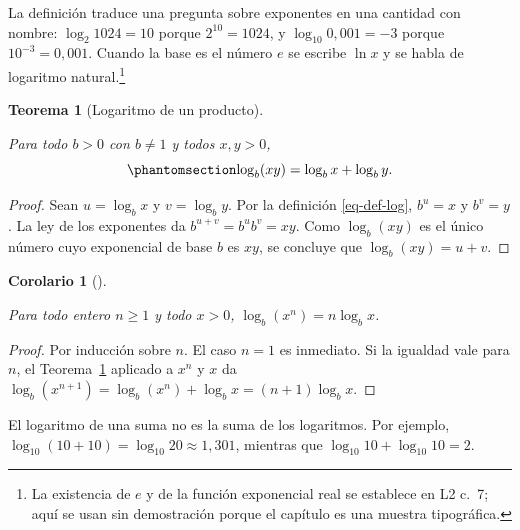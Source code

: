 \documentclass[
  spanish,
  letterpaper,
  a4paper,
  11pt,
  oneside,
  numbers=noenddot]{scrbook}
\theoremstyle{definition}
\theoremstyle{plain}
\newtheorem{corollary}{Corolario}[chapter]
\theoremstyle{definition}
\theoremstyle{definition}
\theoremstyle{plain}
\newtheorem{theorem}{Teorema}[chapter]
\theoremstyle{remark}
\begin{document}
La definición traduce una pregunta sobre exponentes en una cantidad con
nombre: \(\log_{2} 1024 = 10\) porque \(2^{10} = 1024\), y
\(\log_{10} 0{,}001 = -3\) porque \(10^{-3} = 0{,}001\). Cuando la base
es el número \(e\) se escribe \(\ln x\) y se habla de logaritmo
natural.\footnote{La
  existencia de \(e\) y de la función exponencial real se establece en
  L2 c.~7; aquí se usan sin demostración porque el capítulo es una
  muestra tipográfica.}

\begin{theorem}[Logaritmo de un
producto]\protect\hypertarget{thm-log-producto}{}\label{thm-log-producto}

Para todo \(b > 0\) con \(b \neq 1\) y todos \(x, y > 0\),
\begin{equation}\protect\phantomsection\label{eq-log-producto}{
\log_b (xy) = \log_b x + \log_b y .
}\end{equation}

\end{theorem}

\begin{proof}
Sean \(u = \log_b x\) y \(v = \log_b y\). Por la definición
\ref{eq-def-log}, \(b^{u} = x\) y \(b^{v} = y\). La ley de los
exponentes da \(b^{u+v} = b^{u} b^{v} = xy\). Como \(\log_b(xy)\) es el
único número cuyo exponencial de base \(b\) es \(xy\), se concluye que
\(\log_b(xy) = u + v\).
\end{proof}

\begin{corollary}[]\protect\hypertarget{cor-log-potencia}{}\label{cor-log-potencia}

Para todo entero \(n \geq 1\) y todo \(x > 0\),
\(\log_b (x^{n}) = n \log_b x\).

\end{corollary}

\begin{proof}
Por inducción sobre \(n\). El caso \(n = 1\) es inmediato. Si la
igualdad vale para \(n\), el Teorema~\ref{thm-log-producto} aplicado a
\(x^{n}\) y \(x\) da
\(\log_b(x^{n+1}) = \log_b(x^{n}) + \log_b x = (n+1) \log_b x\).
\end{proof}

\begin{tcolorbox}[enhanced jigsaw, arc=.35mm, bottomrule=.15mm, bottomtitle=1mm, breakable, colback=white, colbacktitle=quarto-callout-warning-color!10!white, colframe=quarto-callout-warning-color-frame, coltitle=black, left=2mm, leftrule=.75mm, opacityback=0, opacitybacktitle=0.6, rightrule=.15mm, title=\textcolor{quarto-callout-warning-color}{\faExclamationTriangle}\hspace{0.5em}{Error frecuente}, titlerule=0mm, toprule=.15mm, toptitle=1mm]

El logaritmo de una suma no es la suma de los logaritmos. Por ejemplo,
\(\log_{10}(10 + 10) = \log_{10} 20 \approx 1{,}301\), mientras que
\(\log_{10} 10 + \log_{10} 10 = 2\).

\end{tcolorbox}
\end{document}
